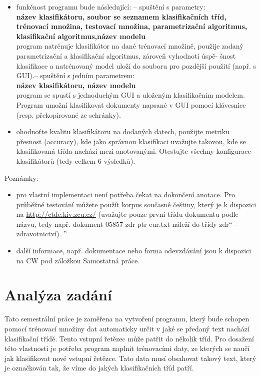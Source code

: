 \documentclass[ 12pt, a4paper]{article}
\begin{document}
\begin{itemize}
\item funkčnost programu bude následující:
– spuštění s parametry:\\
\textbf{název klasifikátoru, soubor se seznamem klasifikačních tříd, trénovací množina, testovací množina, parametrizační algoritmus, klasifikační algoritmus,název modelu}\\
program natrénuje klasifikátor na dané trénovací množině, použije zadaný parametrizační a klasifikační algoritmus, zároveň vyhodnotí úspě- šnost klasifikace a natrénovaný model uloží do souboru pro pozdější použití (např. s GUI).– spuštění s jedním parametrem:\\
\textbf{název klasifikátoru, název modelu} \\
program se spustí s jednoduchým GUI a uloženým klasifikačním modelem. Program umožní klasifikovat dokumenty napsané v GUI pomocí klávesnice (resp. překopírované ze schránky).

\item ohodnoťte kvalitu klasifikátoru na dodaných datech, použijte metriku přesnost (accuracy), kde jako správnou klasifikaci uvažujte takovou, kde se klasifikovaná třída nachází mezi anotovanými. Otestujte všechny konfigurace klasifikátorů (tedy celkem 6 výsledků).
\end{itemize}


Poznámky:
\begin{itemize}
\item pro vlastní implementaci není potřeba čekat na dokončení anotace. Pro průběžné testování můžete použít korpus současné češtiny, který je k dispozici na \url{http://ctdc.kiv.zcu.cz/} (uvažujte pouze první třídu dokumentu podle názvu, tedy např.
dokument 05857 zdr ptr eur.txt náleží do třídy zdr“ - zdravotnictví).
”
\item další informace, např. dokumentace nebo forma odevzdávání jsou k dispozici na CW pod záložkou Samostatná práce.

\end{itemize}
\newpage


\section{Analýza zadání}

Tato semestrální práce je zaměřena na vytvoření programu, který bude schopen pomocí trénovací množiny dat automaticky určit v jaké se předaný text nachází klasifikační třídě. Tento vstupní řetězec může patřit do několik tříd. Pro dosažení této vlastnosti je potřeba program naplnit trénovacími daty, ze kterých se naučí jak klasifikovat nové vstupní řetězce. Tato data musí obsahovat takový text, který je označkován tak, že víme do jakých klasifikačních tříd patří.
\end{document}
